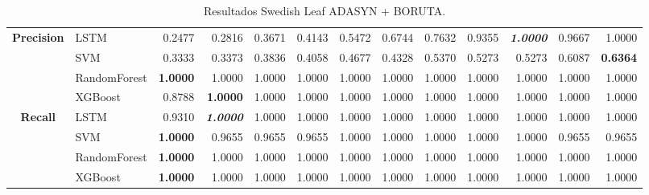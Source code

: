 \begin{table}[H]
\begin{adjustbox}{max width=12cm}
\begin{tabular}{|c|l|r|r|r|r|r|r|r|r|r|r|r|}
		\hline
		\textbf{Precision} &  LSTM &  0.2477 &  0.2816 &  0.3671 &  0.4143 &  0.5472 &  0.6744 &  0.7632 &  0.9355 & \textit{ \textbf{  1.0000 } } &  0.9667 &  1.0000 \\
		&  SVM &  0.3333 &  0.3373 &  0.3836 &  0.4058 &  0.4677 &  0.4328 &  0.5370 &  0.5273 &  0.5273 &  0.6087 & \textbf{  0.6364 } \\
		&  RandomForest & \textbf{  1.0000 } &  1.0000 &  1.0000 &  1.0000 &  1.0000 &  1.0000 &  1.0000 &  1.0000 &  1.0000 &  1.0000 &  1.0000 \\
		&  XGBoost &  0.8788 & \textbf{  1.0000 } &  1.0000 &  1.0000 &  1.0000 &  1.0000 &  1.0000 &  1.0000 &  1.0000 &  1.0000 &  1.0000 \\
		\hline
		\textbf{Recall} &  LSTM &  0.9310 & \textit{ \textbf{  1.0000 } } &  1.0000 &  1.0000 &  1.0000 &  1.0000 &  1.0000 &  1.0000 &  1.0000 &  1.0000 &  1.0000 \\
		&  SVM & \textbf{  1.0000 } &  0.9655 &  0.9655 &  0.9655 &  1.0000 &  1.0000 &  1.0000 &  1.0000 &  1.0000 &  0.9655 &  0.9655 \\
		&  RandomForest & \textbf{  1.0000 } &  1.0000 &  1.0000 &  1.0000 &  1.0000 &  1.0000 &  1.0000 &  1.0000 &  1.0000 &  1.0000 &  1.0000 \\
		&  XGBoost & \textbf{  1.0000 } &  1.0000 &  1.0000 &  1.0000 &  1.0000 &  1.0000 &  1.0000 &  1.0000 &  1.0000 &  1.0000 &  1.0000 \\
		\hline
	\end{tabular}
\end{adjustbox}
\caption{Resultados Swedish Leaf ADASYN + BORUTA.}
\label{tab:SLeaf_ADASYN_BORUTA}
\end{table}

